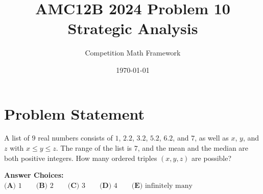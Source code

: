 \documentclass[11pt]{article}
\begin{document}
\title{\textbf{AMC12B 2024 Problem 10\\Strategic Analysis}}
\author{Competition Math Framework}
\date{\today}
\maketitle

\section*{Problem Statement}

A list of $9$ real numbers consists of $1$, $2.2$, $3.2$, $5.2$, $6.2$, and $7$, as well as $x$, $y$, and $z$ with $x \leq y \leq z$. The range of the list is $7$, and the mean and the median are both positive integers. How many ordered triples $(x, y, z)$ are possible?

\vspace{0.5em}
\textbf{Answer Choices:}\\
$\textbf{(A) } 1 \qquad \textbf{(B) } 2 \qquad \textbf{(C) } 3 \qquad \textbf{(D) } 4 \qquad \textbf{(E) } \text{infinitely many}$
\end{document}
